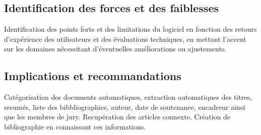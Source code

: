 \subsection{Identification des forces et des faiblesses}
Identification des points forts et des limitations du logiciel en fonction des retours d'expérience des utilisateurs et des évaluations techniques, en mettant l'accent sur les domaines nécessitant d'éventuelles améliorations ou ajustements.

\subsection{Implications et recommandations}
Catégorisation des documents automatiques, extraction automatiques des titres, resumés, liste des bibbliographies, auteur, date de soutenance, encadreur ainsi que les membres de jury. Recupération des articles connexte. Création de bibliographie en connaissant ces informations.

% 
% 
% 
